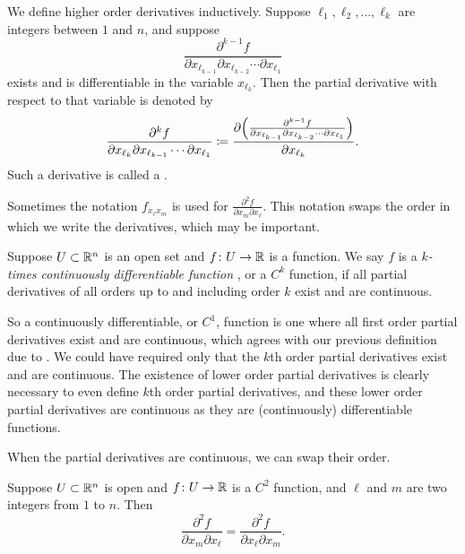 We define higher order derivatives inductively.
Suppose ${\ell}_1,{\ell}_2,\ldots,{\ell}_k$ are integers between $1$ and $n$, and
suppose 
\begin{equation*}
\frac{\partial^{k-1} f}{\partial x_{{\ell}_{k-1}} \partial x_{{\ell}_{k-2}}
\cdots \partial x_{{\ell}_1}}
\end{equation*}
exists and is differentiable in the variable $x_{{\ell}_{k}}$.
Then the partial derivative with respect to that variable is denoted by
\begin{equation*}
\frac{\partial^{k} f}{\partial x_{{\ell}_{k}} \partial x_{{\ell}_{k-1}}
\cdots \partial x_{{\ell}_1}}
\coloneqq 
\frac{\partial \Bigl( \frac{\partial^{k-1} f}{\partial x_{{\ell}_{k-1}} \partial
x_{{\ell}_{k-2}} \cdots \partial x_{{\ell}_1}} \Bigr)}{\partial x_{{\ell}_{k}}} .
\end{equation*}
Such a derivative is called a
\emph{}.

Sometimes the notation $f_{x_{\ell} x_m}$ is used for
$\frac{\partial^2 f}{\partial x_m \partial x_{\ell}}$.  This notation
swaps the order in which we write the derivatives, which may be important.

\begin{defn}
Suppose $U \subset {\mathbb{R}}^n$ is an open set and
$f \colon U \to {\mathbb{R}}$ is a function.  We say $f$ is
a \emph{$k$-times continuously differentiable function}%
,
or a $C^k$ function, if all partial derivatives of all orders up to and
including order $k$ exist and are continuous.
\end{defn}

So a continuously differentiable, or $C^1$, function is one where all
first order partial
derivatives exist and are continuous, which agrees with our previous
definition due to .  We
could have required only that the $k$th order partial derivatives exist and
are continuous.
The existence of lower order partial derivatives is clearly
necessary to even define $k$th order partial derivatives,
and these lower order partial derivatives are continuous as they are
(continuously) differentiable functions.

When the partial derivatives are continuous, we can swap their order.

\begin{prop} \label{mv:prop:swapders}
Suppose $U \subset {\mathbb{R}}^n$ is open and $f \colon U \to {\mathbb{R}}$ is a $C^2$
function, and $\ell$ and $m$ are two integers from $1$ to $n$.  Then
\begin{equation*}
\frac{\partial^2 f}{\partial x_m \partial x_{\ell}}
=
\frac{\partial^2 f}{\partial x_{\ell} \partial x_m} .
\end{equation*}
\end{prop}

